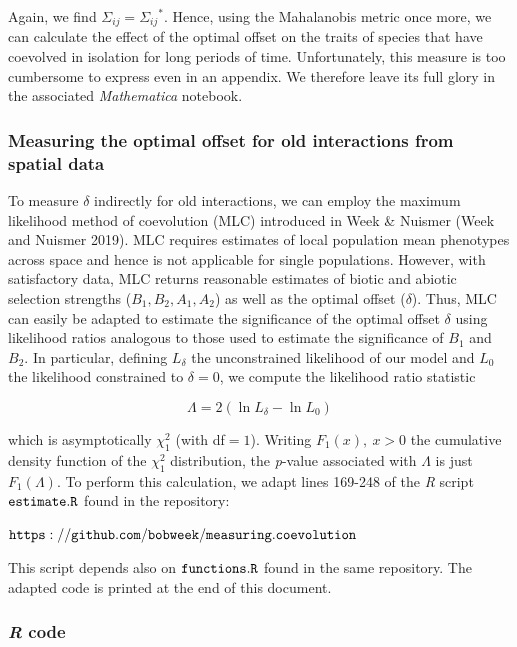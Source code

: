 \documentclass[]{article}
\begin{document}
Again, we find \(\Sigma_{ij}={\Sigma_{ij}}^*\). Hence, using the
Mahalanobis metric once more, we can calculate the effect of the optimal
offset on the traits of species that have coevolved in isolation for
long periods of time. Unfortunately, this measure is too cumbersome to
express even in an appendix. We therefore leave its full glory in the
associated \emph{Mathematica} notebook.

\hypertarget{measuring-the-optimal-offset-for-old-interactions-from-spatial-data}{%
\subsubsection{Measuring the optimal offset for old interactions from
spatial
data}\label{measuring-the-optimal-offset-for-old-interactions-from-spatial-data}}

To measure \(\delta\) indirectly for old interactions, we can employ the
maximum likelihood method of coevolution (MLC) introduced in Week \&
Nuismer (Week and Nuismer 2019). MLC requires estimates of local
population mean phenotypes across space and hence is not applicable for
single populations. However, with satisfactory data, MLC returns
reasonable estimates of biotic and abiotic selection strengths
(\(B_1,B_2,A_1,A_2\)) as well as the optimal offset (\(\delta\)). Thus,
MLC can easily be adapted to estimate the significance of the optimal
offset \(\delta\) using likelihood ratios analogous to those used to
estimate the significance of \(B_1\) and \(B_2\). In particular,
defining \(L_\delta\) the unconstrained likelihood of our model and
\(L_0\) the likelihood constrained to \(\delta=0\), we compute the
likelihood ratio statistic

\[\Lambda=2(\ln L_\delta-\ln L_0)\]

which is asymptotically \(\chi^2_1\) (with df\(=1\)). Writing
\(F_1(x), \ x>0\) the cumulative density function of the \(\chi^2_1\)
distribution, the \emph{p}-value associated with \(\Lambda\) is just
\(F_1(\Lambda)\). To perform this calculation, we adapt lines 169-248 of
the \emph{R} script \(\tt{estimate.R}\) found in the repository:

\(\tt{https://github.com/bobweek/measuring.coevolution}\)

This script depends also on \(\tt{functions.R}\) found in the same
repository. The adapted code is printed at the end of this document.

\hypertarget{r-code}{%
\subsubsection{\texorpdfstring{\emph{R} code}{R code}}\label{r-code}}
\end{document}

